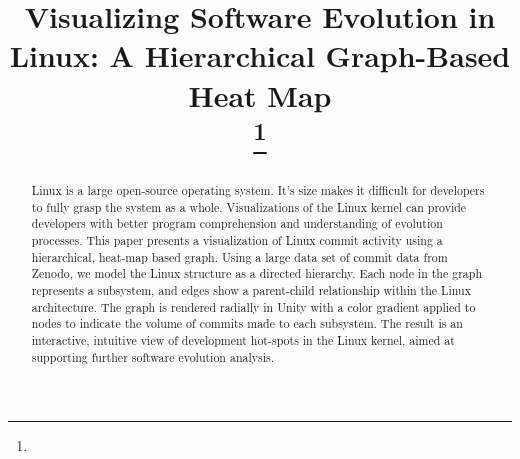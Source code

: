 \documentclass[conference]{IEEEtran}
\begin{document}
\title{Visualizing Software Evolution in Linux: A Hierarchical Graph-Based Heat Map\\

\thanks{}
}

\author{
\and
{}
}



\maketitle

\begin{abstract}
Linux is a large open-source operating system. It's size makes it difficult for developers to fully grasp the system as a whole. Visualizations of the Linux kernel can provide developers with better program comprehension and understanding of evolution processes. This paper presents a visualization of Linux commit activity using a hierarchical, heat-map based graph. Using a large data set of commit data from Zenodo, we model the Linux structure as a directed hierarchy. Each node in the graph represents a subsystem, and edges show a parent-child relationship within the Linux architecture. The graph is rendered radially in Unity with a color gradient applied to nodes to indicate the volume of commits made to each subsystem. The result is an interactive, intuitive view of development hot-spots in the Linux kernel, aimed at supporting further software evolution analysis. 
\end{abstract}
\end{document}
